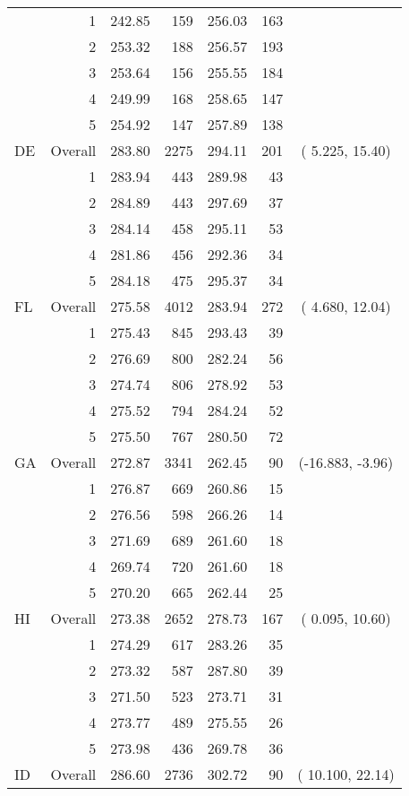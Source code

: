 \begin{longtable}{lrrr@{\extracolsep{.25cm}}rrc}
   & 1 & 242.85 & 159 & 256.03 & 163 &  \\ 
   & 2 & 253.32 & 188 & 256.57 & 193 &  \\ 
   & 3 & 253.64 & 156 & 255.55 & 184 &  \\ 
   & 4 & 249.99 & 168 & 258.65 & 147 &  \\ 
   & 5 & 254.92 & 147 & 257.89 & 138 &  \\ 
   \hline
DE & Overall & 283.80 & 2275 & 294.11 & 201 & (  5.225,  15.40) \\ 
   & 1 & 283.94 & 443 & 289.98 &  43 &  \\ 
   & 2 & 284.89 & 443 & 297.69 &  37 &  \\ 
   & 3 & 284.14 & 458 & 295.11 &  53 &  \\ 
   & 4 & 281.86 & 456 & 292.36 &  34 &  \\ 
   & 5 & 284.18 & 475 & 295.37 &  34 &  \\ 
   \hline
FL & Overall & 275.58 & 4012 & 283.94 & 272 & (  4.680,  12.04) \\ 
   & 1 & 275.43 & 845 & 293.43 &  39 &  \\ 
   & 2 & 276.69 & 800 & 282.24 &  56 &  \\ 
   & 3 & 274.74 & 806 & 278.92 &  53 &  \\ 
   & 4 & 275.52 & 794 & 284.24 &  52 &  \\ 
   & 5 & 275.50 & 767 & 280.50 &  72 &  \\ 
   \hline
GA & Overall & 272.87 & 3341 & 262.45 &  90 & (-16.883,  -3.96) \\ 
   & 1 & 276.87 & 669 & 260.86 &  15 &  \\ 
   & 2 & 276.56 & 598 & 266.26 &  14 &  \\ 
   & 3 & 271.69 & 689 & 261.60 &  18 &  \\ 
   & 4 & 269.74 & 720 & 261.60 &  18 &  \\ 
   & 5 & 270.20 & 665 & 262.44 &  25 &  \\ 
   \hline
HI & Overall & 273.38 & 2652 & 278.73 & 167 & (  0.095,  10.60) \\ 
   & 1 & 274.29 & 617 & 283.26 &  35 &  \\ 
   & 2 & 273.32 & 587 & 287.80 &  39 &  \\ 
   & 3 & 271.50 & 523 & 273.71 &  31 &  \\ 
   & 4 & 273.77 & 489 & 275.55 &  26 &  \\ 
   & 5 & 273.98 & 436 & 269.78 &  36 &  \\ 
   \hline
ID & Overall & 286.60 & 2736 & 302.72 &  90 & ( 10.100,  22.14) \\ 

\end{longtable}
